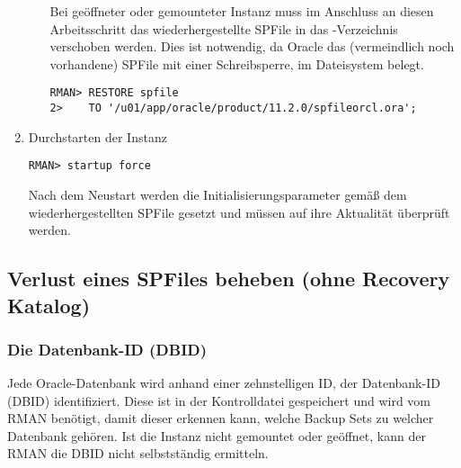 \begin{enumerate}
\begin{itemize}
                Bei ge\"offneter oder gemounteter Instanz muss im Anschluss an diesen Arbeitsschritt das wiederhergestellte SPFile in das -Verzeichnis verschoben werden. Dies ist notwendig, da Oracle das (vermeindlich noch vorhandene) SPFile mit einer Schreibsperre, im Dateisystem belegt.
								\begin{lstlisting}[caption={Wiederherstellen des SPFiles in der MOUNT-Phase},label=admin1413,language=rman]
RMAN> RESTORE spfile
2>    TO '/u01/app/oracle/product/11.2.0/spfileorcl.ora';
                  \end{lstlisting}
              \end{itemize}
            \item Durchstarten der Instanz
              \begin{lstlisting}[caption={Neustart der Instanz},label=admin1414,language=rman,alsolanguage=sqlplus]
RMAN> startup force
              \end{lstlisting}
              Nach dem Neustart werden die Initialisierungsparameter gem\"a\ss{} dem wiederhergestellten SPFile gesetzt und m\"ussen auf ihre Aktualit\"at \"uberpr\"uft werden.
          \end{enumerate}
\clearpage
      \subsection{Verlust eines SPFiles beheben (ohne Recovery Katalog)}
        \subsubsection{Die Datenbank-ID (DBID)}
          Jede Oracle-Datenbank wird anhand einer zehnstelligen ID, der Datenbank-ID (DBID) identifiziert. Diese ist in der Kontrolldatei gespeichert und wird vom RMAN ben\"otigt, damit dieser erkennen kann, welche Backup Sets zu welcher Datenbank geh\"oren. Ist die Instanz nicht gemountet oder ge\"offnet, kann der RMAN die DBID nicht selbstst\"andig ermitteln.

